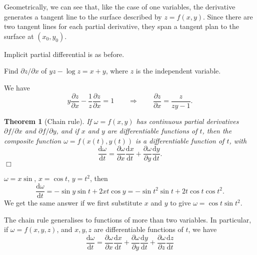 \documentclass[letter-paper]{tufte-book}
\newtheorem{theorem}{\color{pastel-blue}Theorem}[section]
\newenvironment{example}[1][Example]{\begin{trivlist}
\item[\hskip \labelsep {\bfseries #1}]}{\end{trivlist}}
\newcommand{\dy}{\partial}
\newcommand{\ddy}[2]{\frac{\dy#1}{\dy#2}}
\newcommand{\qedwhite}{\hfill \ensuremath{\Box}}
\begin{document}
Geometrically, we can see that, like the case of one variables, the derivative
generates a tangent line to the surface described by $z=f(x,y)$. Since there are
two tangent lines for each partial derivative, they span a tangent plan to the
surface at $(x_0,y_0)$.

Implicit partial differential is as before.
\begin{example}
  Find $\dy z/\dy x$ of $yz-\log z=x+y$, where $z$ is the independent variable.
  
  We have
  \begin{equation*}
    y\ddy{z}{x}-\frac{1}{z}\ddy{z}{x}=1\qquad\Rightarrow\qquad
    \ddy{z}{x}=\frac{z}{zy-1}.
  \end{equation*}
\end{example}

\begin{theorem}[Chain rule]
  If $\omega=f(x,y)$ has continuous partial derivatives $\dy f/\dy x$ and $\dy
  f/\dy y$, and if $x$ and $y$ are differentiable functions of $t$, then the
  composite function $\omega=f(x(t),y(t))$ is a differentiable function of $t$,
  with
  \begin{equation*}
    \frac{\mathrm{d}\omega}{\mathrm{d}t}=
    \ddy{\omega}{x}\frac{\mathrm{d}x}{\mathrm{d}t}+
    \ddy{\omega}{y}\frac{\mathrm{d}y}{\mathrm{d}t}.
  \end{equation*}
  \qedwhite
\end{theorem}
\begin{example}
  $\omega=x\sin $, $x=\cos t$, $y=t^2$, then
  \begin{equation*}
    \frac{\mathrm{d}\omega}{\mathrm{d}t}=-\sin y\sin t+2xt\cos y
    =-\sin t^2\sin t+2t\cos t\cos t^2.
  \end{equation*}
  We get the same answer if we first substitute $x$ and $y$ to give $\omega=\cos
  t\sin t^2$.
\end{example}

The chain rule generalises to functions of more than two variables. In
particular, if $\omega=f(x,y,z)$, and $x,y,z$ are differentiable functions of
$t$, we have
\begin{equation*}
  \frac{\mathrm{d}\omega}{\mathrm{d}t}=
  \ddy{\omega}{x}\frac{\mathrm{d}x}{\mathrm{d}t}+
  \ddy{\omega}{y}\frac{\mathrm{d}y}{\mathrm{d}t}+
  \ddy{\omega}{z}\frac{\mathrm{d}z}{\mathrm{d}t}
\end{equation*}
\end{document}
